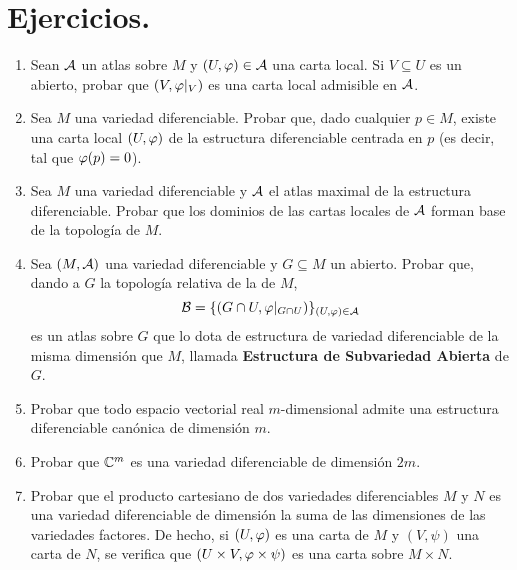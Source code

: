 \documentclass[cursovd_portada.tex]{subfiles}
\begin{document}
\section{Ejercicios.}
\begin{enumerate}
\item Sean ${\cal A}$ un atlas sobre $M$ y $(U,\varphi)\in{\cal A}$ una
carta local. Si $V\subseteq U$ es un abierto, probar que
$(V,\varphi|_V)$ es una carta local admisible en ${\cal A}$. \item Sea
$M$ una variedad diferenciable. Probar que, dado cualquier $p\in
M$, existe una carta local $(U,\varphi)$ de la estructura
diferenciable centrada en $p$ (es decir, tal que $\varphi(p)=0$).
\item Sea $M$ una variedad diferenciable y ${\cal A}$ el atlas
maximal de la estructura diferenciable. Probar que los dominios de
las cartas locales de ${\cal A}$ forman base de la topología
de $M$. \item Sea $(M,{\cal A})$ una variedad diferenciable y
$G\subseteq M$ un abierto. Probar que, dando a $G$ la
topología relativa de la de $M$,
$${\cal B}=\{(G\cap U,\varphi|_{G\cap U})\}_{(U,\varphi)\in{\cal A}}$$
es un atlas sobre $G$ que lo dota de estructura de variedad
diferenciable de la misma dimensión que $M$, llamada {\bf
Estructura de Subvariedad Abierta} de $G$. \item Probar que todo
espacio vectorial real $m$-dimensional admite una estructura
diferenciable canónica de dimensión $m$. \item Probar que
$\mathbb{C}^m$ es una variedad diferenciable de dimensión $2m$. \item
Probar que el producto cartesiano de dos variedades diferenciables
$M$ y $N$ es una variedad diferenciable de dimensión la suma
de las dimensiones de las variedades factores. De hecho, si
$(U,\varphi)$ es una carta de $M$ y $(V,\psi)$ una carta de $N$, se
verifica que $(U\times V,\varphi\times\psi)$ es una carta sobre
$M\times N$.
\end{enumerate}
\end{document}
